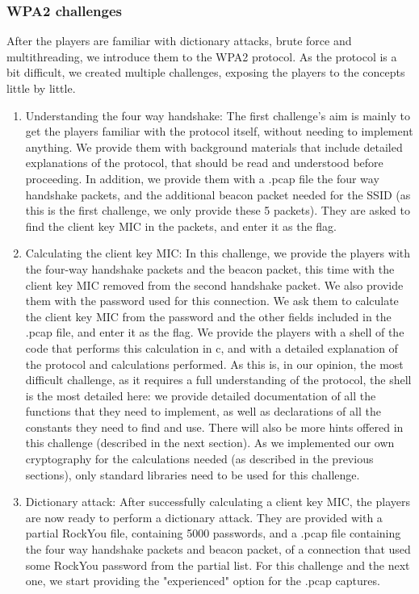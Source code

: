 \documentclass[sigconf]{acmart}
\begin{document}
\subsubsection{WPA2 challenges}
After the players are familiar with dictionary attacks, brute force and multithreading, we introduce them to the WPA2 protocol. As the protocol is a bit difficult, we created multiple challenges, exposing the players to the concepts little by little.

\begin{enumerate}
\item Understanding the four way handshake:
  The first challenge’s aim is mainly to get the players familiar with the protocol itself, without needing to implement anything. We provide them with background materials that include detailed explanations of the protocol, that should be read and understood before proceeding.
  In addition, we provide them with a .pcap file the four way handshake packets, and the additional beacon packet needed for the SSID (as this is the first challenge, we only provide these 5 packets). They are asked to find the client key MIC in the packets, and enter it as the flag.
\item Calculating the client key MIC:
  In this challenge, we provide the players with the four-way handshake packets and the beacon packet, this time with the client key MIC removed from the second handshake packet. We also provide them with the password used for this connection.
  We ask them to calculate the client key MIC from the password and the other fields included in the .pcap file, and enter it as the flag.
  We provide the players with a shell of the code that performs this calculation in c, and with a detailed explanation of the protocol and calculations performed.
  As this is, in our opinion, the most difficult challenge, as it requires a full understanding of the protocol, the shell is the most detailed here: we provide detailed documentation of all the functions that they need to implement, as well as declarations of all the constants they need to find and use. There will also be more hints offered in this challenge (described in the next section).
  As we implemented our own cryptography for the calculations needed (as described in the previous sections), only standard libraries need to be used for this challenge.
\item Dictionary attack:
  After successfully calculating a client key MIC, the players are now ready to perform a dictionary attack.
  They are provided with a partial RockYou file, containing 5000 passwords, and a .pcap file containing the four way handshake packets and beacon packet, of a connection that used some RockYou password from the partial list. For this challenge and the next one, we start providing the "experienced" option for the .pcap captures.

\end{enumerate}
\end{document}
